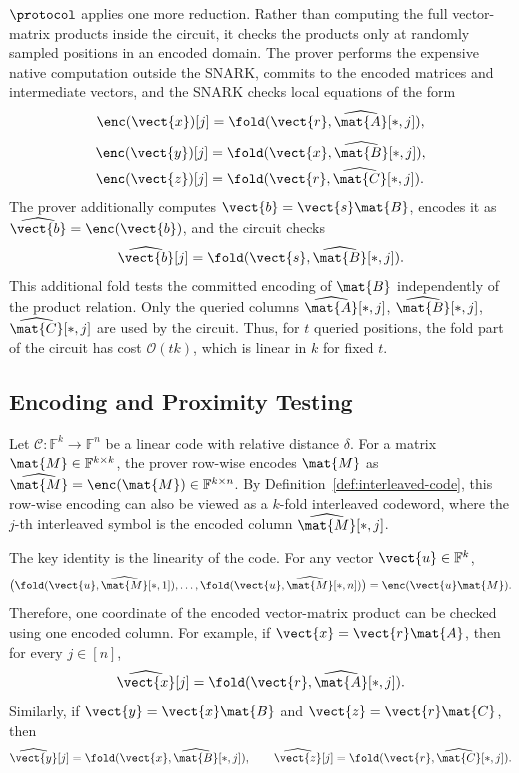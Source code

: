 \(\protocol\) applies one more reduction.  Rather than computing the full
vector-matrix products inside the circuit, it checks the products only at
randomly sampled positions in an encoded domain.  The prover performs the
expensive native computation outside the SNARK, commits to the encoded
matrices and intermediate vectors, and the SNARK checks local equations of the
form
\[
  \enc(\vect{x})[j]
  =
  \fold(\vect{r},\widehat{\mat{A}}[*,j]),
\]
\[
\begin{aligned}
  \enc(\vect{y})[j]
  &=
  \fold(\vect{x},\widehat{\mat{B}}[*,j]),\\
  \enc(\vect{z})[j]
  &=
  \fold(\vect{r},\widehat{\mat{C}}[*,j]).
\end{aligned}
\]
The prover additionally computes \(\vect{b}=\vect{s}\mat{B}\), encodes it as
\(\widehat{\vect{b}}=\enc(\vect{b})\), and the circuit checks
\[
  \widehat{\vect{b}}[j]
  =
  \fold(\vect{s},\widehat{\mat{B}}[*,j]).
\]
This additional fold tests the committed encoding of \(\mat{B}\) independently
of the product relation.
Only the queried columns
\(\widehat{\mat{A}}[*,j]\), \(\widehat{\mat{B}}[*,j]\),
\(\widehat{\mat{C}}[*,j]\) are used by the circuit.  Thus, for \(t\) queried
positions, the fold part of the circuit has cost \(\mathcal{O}(tk)\), which is
linear in \(k\) for fixed \(t\).

\subsection{Encoding and Proximity Testing}
\label{sec:overview-encoding}

Let \(\mathcal{C}:\mathbb{F}^k\to\mathbb{F}^n\) be a linear code
with relative distance \(\delta\).  For a matrix
\(\mat{M}\in\mathbb{F}^{k\times k}\), the prover row-wise encodes \(\mat{M}\)
as $\widehat{\mat{M}}=\enc(\mat{M})\in\mathbb{F}^{k\times n}$.
By Definition~\ref{def:interleaved-code}, this row-wise encoding can also be
viewed as a \(k\)-fold interleaved codeword, where the \(j\)-th interleaved
symbol is the encoded column \(\widehat{\mat{M}}[*,j]\).

The key identity is the linearity of the code.  For any vector
\(\vect{u}\in\mathbb{F}^k\),
\[
  \big(
  \fold(\vect{u},\widehat{\mat{M}}[*,1]),
  \ldots,
  \fold(\vect{u},\widehat{\mat{M}}[*,n])
  \big)
  =
  \enc(\vect{u}\mat{M}).
\]
Therefore, one coordinate of the encoded vector-matrix product can be checked
using one encoded column.  For example, if
\(\vect{x}=\vect{r}\mat{A}\), then for every \(j\in[n]\),
\[
  \widehat{\vect{x}}[j]
  =
  \fold(\vect{r},\widehat{\mat{A}}[*,j]).
\]
Similarly, if \(\vect{y}=\vect{x}\mat{B}\) and
\(\vect{z}=\vect{r}\mat{C}\), then
\[
  \widehat{\vect{y}}[j]
  =
  \fold(\vect{x},\widehat{\mat{B}}[*,j]),
  \qquad
  \widehat{\vect{z}}[j]
  =
  \fold(\vect{r},\widehat{\mat{C}}[*,j]).
\]

